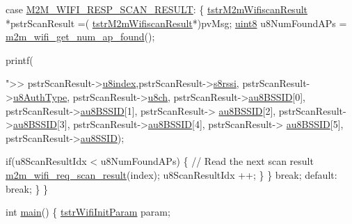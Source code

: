 \begin{DoxyCode}
{{    \textcolor{keywordflow}{case} \hyperlink{group__WlanEnums_gga064de09dec1d5e88ed8d075fa40f57deadfb48e88c3a8e5f9dac634d62d3f53e5}{M2M\_WIFI\_RESP\_SCAN\_RESULT}:
        \{
            \hyperlink{structtstrM2mWifiscanResult}{tstrM2mWifiscanResult}       *pstrScanResult =(
      \hyperlink{structtstrM2mWifiscanResult}{tstrM2mWifiscanResult}*)pvMsg;
            \hyperlink{group__DataT_ga4df709a77647e870bbf1d955b8edc9a6}{uint8}                       u8NumFoundAPs = 
      \hyperlink{group__WifiGetNumAPFoundFn_gac92223273822358f4aee6e133b11815d}{m2m\_wifi\_get\_num\_ap\_found}();
            
            printf(\textcolor{stringliteral}{">>%
                pstrScanResult->\hyperlink{structtstrM2mWifiscanResult_a70c6b917a7693e2afcc8e912e10f1d96}{u8index},pstrScanResult->\hyperlink{structtstrM2mWifiscanResult_a34d94f696097c6c569b480fe4262a2cc}{s8rssi},
                pstrScanResult->\hyperlink{structtstrM2mWifiscanResult_a0b9dbf6b40e1def154c89c53a7ceb381}{u8AuthType},
                pstrScanResult->\hyperlink{structtstrM2mWifiscanResult_a345089f7fa5a6570886c340c08cfeb2e}{u8ch},
                pstrScanResult->\hyperlink{structtstrM2mWifiscanResult_ae1d4c47f31a39e2423d5c7894022b95c}{au8BSSID}[0], pstrScanResult->\hyperlink{structtstrM2mWifiscanResult_ae1d4c47f31a39e2423d5c7894022b95c}{au8BSSID}[1], pstrScanResult->
      \hyperlink{structtstrM2mWifiscanResult_ae1d4c47f31a39e2423d5c7894022b95c}{au8BSSID}[2],
                pstrScanResult->\hyperlink{structtstrM2mWifiscanResult_ae1d4c47f31a39e2423d5c7894022b95c}{au8BSSID}[3], pstrScanResult->\hyperlink{structtstrM2mWifiscanResult_ae1d4c47f31a39e2423d5c7894022b95c}{au8BSSID}[4], pstrScanResult->
      \hyperlink{structtstrM2mWifiscanResult_ae1d4c47f31a39e2423d5c7894022b95c}{au8BSSID}[5],
                pstrScanResult->\hyperlink{structtstrM2mWifiscanResult_a9636bd1e4481cde0a1523a97a394b185}{au8SSID});
            
            \textcolor{keywordflow}{if}(u8ScanResultIdx < u8NumFoundAPs)
            \{
                \textcolor{comment}{// Read the next scan result}
                \hyperlink{group__WifiReqScanResult_ga2585ee08ee8ecac67155ec99dd4d0863}{m2m\_wifi\_req\_scan\_result}(index);
                u8ScanResultIdx ++;
            \}
        \}
        \textcolor{keywordflow}{break};
    \textcolor{keywordflow}{default}:
        \textcolor{keywordflow}{break};
    \}
\}

\textcolor{keywordtype}{int} \hyperlink{demo_2microchip_2pic32mz__ef__curiosity_2wifi__http__server__demo_2src_2main_8c_ac5a1eca594b063e0d2dbccf86f96f221}{main}()
\{
    \hyperlink{structtstrWifiInitParam}{tstrWifiInitParam}   param;
    
}}}
\end{DoxyCode}
